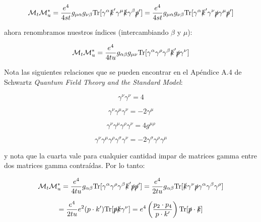 \begin{equation}
\mathcal{M}_t \mathcal{M}_u^* = \frac{e^4}{4st} g_{\mu \alpha} g_{\nu \beta} \text{Tr}[\gamma^\alpha \slashed{k}' \gamma^\mu \slashed{k} \gamma^\beta \slashed{p}'] = \frac{e^4}{4st} g_{\mu \alpha} g_{\nu \beta} \text{Tr}[\gamma^\alpha \slashed{k}' \gamma^\nu \slashed{p} \gamma^\mu \slashed{p}']
\end{equation}

ahora renombramos nuestros índices (intercambiando $\beta$ y $\mu$):

\begin{equation}
\mathcal{M}_t \mathcal{M}_u^* = \frac{e^4}{4tu} g_{\alpha \beta} g_{\mu \nu} \text{Tr}[\gamma^\alpha \gamma^\rho \gamma^\beta \slashed{k}' \slashed{p} \gamma^\nu]
\end{equation}

Nota las siguientes relaciones que se pueden encontrar en el Apéndice A.4 de Schwartz \textit{Quantum Field Theory and the Standard Model}:

\begin{equation}
\gamma^\nu \gamma^\nu = 4
\end{equation}

\begin{equation}
\gamma^\nu \gamma^\mu \gamma^\nu = -2\gamma^\mu
\end{equation}

\begin{equation}
\gamma^\nu \gamma^\mu \gamma^\rho \gamma^\nu = 4g^{\mu \rho}
\end{equation}

\begin{equation}
\gamma^\nu \gamma^\mu \gamma^\rho \gamma^\sigma \gamma^\nu = -2\gamma^\sigma \gamma^\rho \gamma^\mu
\end{equation}

y nota que la cuarta vale para cualquier cantidad impar de matrices gamma entre dos matrices gamma contraídas. Por lo tanto:

\begin{equation}
\mathcal{M}_t \mathcal{M}_u^* = \frac{e^4}{4tu} g_{\alpha \beta} \text{Tr}[\gamma^\alpha \gamma^\rho \gamma^\beta \slashed{k}' \slashed{p} \slashed{p}'] = \frac{e^4}{2tu} g_{\alpha \beta} \text{Tr}[\slashed{k} \gamma^\nu \slashed{p} \gamma^\alpha \gamma^\beta \gamma^\rho]
\end{equation}

\begin{equation}
= \frac{e^4}{2tu} e^2 (p \cdot k')\text{Tr}[\slashed{p} \slashed{k} \gamma^\nu] = e^4 \left( \frac{p_2 \cdot p_4}{p\cdot k'} \right) \text{Tr}[\slashed{p} \cdot \slashed{k}]
\end{equation}

